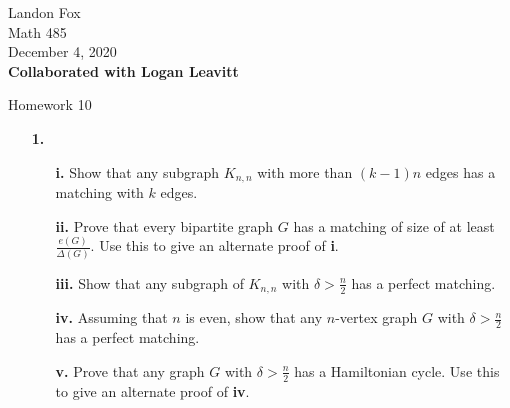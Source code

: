 \documentclass[ 12pt ]{article}
\begin{document}
\noindent Landon Fox \\
\noindent Math 485 \\
\noindent December 4, 2020 \\
\noindent \textbf{Collaborated with Logan Leavitt}

\begin{center}
	\Large Homework 10
\end{center}

\begin{enumerate}
	\item[\textbf{1.}]
		\begin{enumerate}
			\item[\textbf{i.}] Show that any subgraph $K_{n, n}$ with more than $(k-1)n$ edges has a matching with $k$ edges.
			\item[\textbf{ii.}] Prove that every bipartite graph $G$ has a matching of size of at least $\frac{e(G)}{\Delta(G)}$. Use this to give an alternate proof of \textbf{i}.
			\item[\textbf{iii.}] Show that any subgraph of $K_{n, n}$ with $\delta > \frac{n}{2}$ has a perfect matching.
			\item[\textbf{iv.}] Assuming that $n$ is even, show that any $n$-vertex graph $G$ with $\delta > \frac{n}{2}$ has a perfect matching.
			\item[\textbf{v.}] Prove that any graph $G$ with $\delta > \frac{n}{2}$ has a Hamiltonian cycle. Use this to give an alternate proof of \textbf{iv}.
		\end{enumerate}


\end{enumerate}
\end{document}
